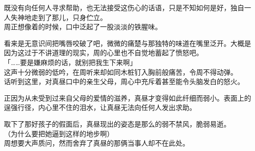 既没有向任何人寻求帮助，也无法接受这伤心的话语，只是不知如何是好，独自一人失神地走到了那儿，只身伫立。\\

周正想像着的时候，口中泛起了一股淡淡的铁腥味。

看来是无意识间把嘴唇咬破了吧，微微的痛楚与那独特的味道在嘴里泛开。大概是因为这过于不讲道理的现实，周的心里也不自觉地蓄起了愤怒吧。\\

「……要是嫌麻烦的话，就别把我生下来啊」\\

这声十分微弱的低吟，在周听来却如同木桩钉入胸前般痛苦，令周不得动弹。\\

话听到这里，对真昼口中的亲生父母，周心中充斥着甚至能令头脑发白的怒火。

正因为从未受到过来自父母的爱情的滋养，真昼才变得如此纤细而弱小。表面上的逞强行径，内心里不住的泪水，让真昼无法向任何人发出求助。

%  


取下了那好孩子的假面后，真昼现出的姿态是那么的弱不禁风，脆弱易逝。\\

（为什么要把她逼到这样的地步啊）\\

周想要大声质问，然而舍弃了真昼的那俩当事人却不在此处。

